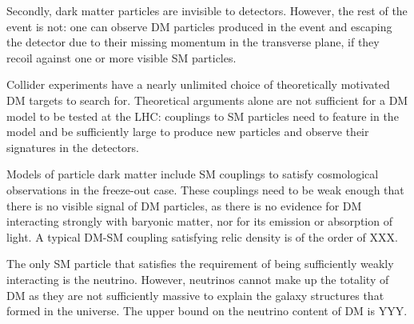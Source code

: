 
Secondly, dark matter particles are invisible to detectors. 
However, the rest of the event is not: one can observe DM particles
produced in the event and escaping the detector 
due to their missing momentum in the transverse plane, if they recoil against one or 
more visible SM particles. 



Collider experiments have a nearly unlimited choice of theoretically
motivated DM targets to search for. 
Theoretical arguments alone are not sufficient for a DM model to be tested at the LHC: 
couplings to SM particles need to feature in the model and be sufficiently large
to produce new particles and observe their signatures in the detectors. 


Models of particle dark matter include SM couplings to satisfy cosmological observations in the freeze-out case. These couplings need to be weak enough that there is no visible signal of DM particles, as there is no evidence for DM interacting strongly with baryonic matter, nor for its emission or absorption of light. A typical DM-SM coupling satisfying relic density is of the order of XXX. 

The only SM particle that satisfies the requirement of being sufficiently weakly interacting is the neutrino. However, neutrinos cannot make up the totality of DM as they are not sufficiently massive to explain the galaxy structures that formed in the universe. %
The upper bound on the neutrino content of DM is YYY. 

